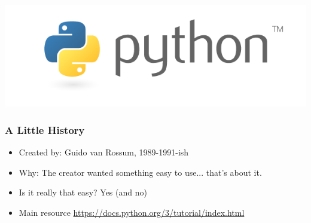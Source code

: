 

\begin{frame}
\begin{center}
\includegraphics[scale=0.25]{python-logo-master-v3-TM.png}
\end{center}
\end{frame}

\begin{frame}
\frametitle{A Little History}

\begin{itemize}
\item Created by: Guido van Rossum, 1989-1991-ish
\item Why: The creator wanted something easy to use... that's about it.
\item Is it really that easy? Yes (and no)
\item Main resource \url{https://docs.python.org/3/tutorial/index.html}
\end{itemize}

\end{frame}



%
